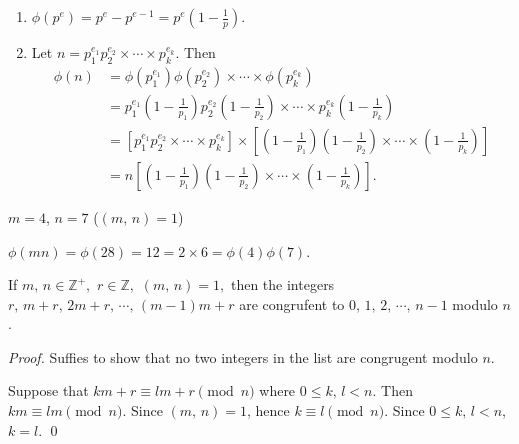 \begin{remark}
    \begin{enumerate}
        \item $\phi\left(p^e\right) = p^e-p^{e-1} = p^e\left(1-\frac{1}{p}\right)$.
        \item Let $n=p_1^{e_1}p_2^{e_2}\times\cdots\times p_k^{e_k}$. Then
        \begin{align*}
            \phi\left(n\right)&=  \phi\left(p_1^{e_1}\right) \phi\left(p_2^{e_2}\right)\times\cdots\times \phi\left(p_k^{e_k}\right) \\
            &= p_1^{e_1} \left(1-\frac{1}{p_1}\right) p_2^{e_2} \left(1-\frac{1}{p_2}\right) \times\cdots\times p_k^{e_k} \left(1-\frac{1}{p_k}\right) \\
            &= \left[p_1^{e_1} p_2^{e_2} \times\cdots\times p_k^{e_k}\right] \times \left[\left(1-\frac{1}{p_1}\right) \left(1-\frac{1}{p_2}\right) \times\cdots\times \left(1-\frac{1}{p_k}\right)\right] \\
            &= n \left[\left(1-\frac{1}{p_1}\right) \left(1-\frac{1}{p_2}\right) \times\cdots\times \left(1-\frac{1}{p_k}\right)\right].
        \end{align*}
    \end{enumerate}
\end{remark}

\begin{note}
    $m=4$, $n=7$ ($\left(m,\,n\right)=1$)

    $\phi\left(mn\right)=\phi\left(28\right) = 12 = 2 \times 6 =\phi\left(4\right)\phi\left(7\right)$.
\end{note}

\begin{lemma}
    If $m,\,n \in \mathbb{Z}^+,$ $r \in \mathbb{Z},$ $\left(m,\,n\right)=1,$ then
    the integers $r,\,m+r,\,2m+r,\,\cdots,\,\left(m-1\right)m+r$
    are congrufent to $0,\,1,\,2,\,\cdots,\,n-1$ modulo $n$.
\end{lemma}
\begin{proof}
    Suffies to show that no two integers in the list are congrugent modulo $n$.

    Suppose that $km+r \equiv lm+r\pmod{n}$ where $0 \leq k,\,l < n$. Then
    $km \equiv lm\pmod{n}$.
    Since $\left(m,\,n\right)=1$, hence $k \equiv l\pmod{n}$.
    Since $0 \leq k,\,l < n$, $k=l$. \qed
\end{proof}

